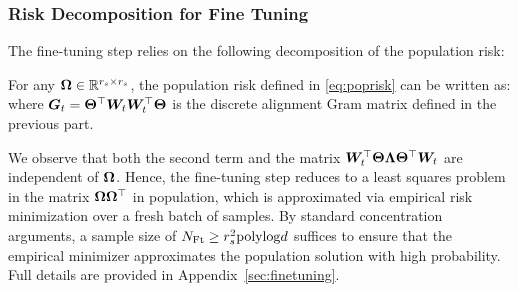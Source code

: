 \subsubsection*{Risk Decomposition for Fine Tuning}

The fine-tuning step relies on the following decomposition of the population risk:

\begin{proposition}
\label{prop:riskdecomptext}
    For any $\boldsymbol{\Omega} \in \mathbb{R}^{r_s \times r_s}$, the population risk defined in \eqref{eq:poprisk} can be written as:
where  $\boldsymbol{G}_t = \boldsymbol{\Theta}^\top \boldsymbol{W}_t \boldsymbol{W}_t^\top \boldsymbol{\Theta}$ is the discrete alignment Gram matrix defined in the previous part.
\end{proposition}

We observe  that both the second term and the matrix $\boldsymbol{W}_t^\top \boldsymbol{\Theta} \boldsymbol{\Lambda} \boldsymbol{\Theta}^\top \boldsymbol{W}_t$ are independent of $\boldsymbol{\Omega}$. Hence, the fine-tuning step reduces to a least squares problem in the matrix $\boldsymbol{\Omega} \boldsymbol{\Omega}^\top$ in population, which is approximated via empirical risk minimization over a fresh batch of samples. By standard concentration arguments, a sample size of $N_{\mathrm{Ft}} \geq r_s^2 \mathrm{polylog} d$ suffices to ensure that the empirical minimizer approximates the population solution with high probability. Full details are provided in Appendix~\ref{sec:finetuning}.
